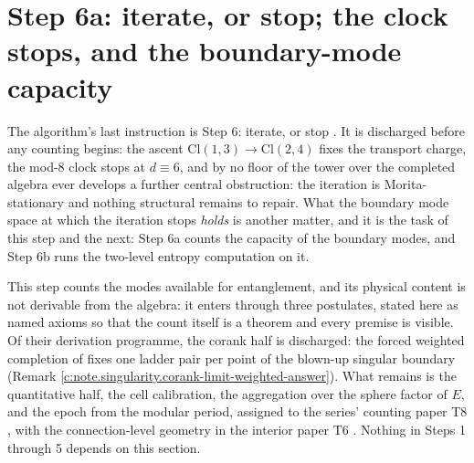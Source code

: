 \documentclass[11pt]{article}
\theoremstyle{definition}
\theoremstyle{plain}
\providecommand{\Cl}{}\renewcommand{\Cl}{\mathrm{Cl}}
\begin{document}
\section{Step 6a: iterate, or stop; the clock stops, and the boundary-mode capacity}

\label{c:note.singularity.setting-step-6a-iterate-or-stop}
The algorithm's last instruction is Step 6: iterate, or stop \cite[\S 8.1, Step 6]{ButlerT1}. It is discharged before any counting begins: the ascent $\Cl(1,3) \to \Cl(2,4)$ fixes the transport charge, the mod-8 clock stops at $d \equiv 6$, and by \cite[Thm.~3.6]{ButlerT3} no floor of the tower over the completed algebra ever develops a further central obstruction: the iteration is Morita-stationary and nothing structural remains to repair. What the boundary mode space at which the iteration stops \emph{holds} is another matter, and it is the task of this step and the next: Step 6a counts the capacity of the boundary modes, and Step 6b runs the two-level entropy computation on it.

This step counts the modes available for entanglement, and its physical content is not derivable from the algebra: it enters through three postulates, stated here as named axioms so that the count itself is a theorem and every premise is visible. Of their derivation programme, the corank half is discharged: the forced weighted completion of \cite[\S 8]{ButlerT4} fixes one ladder pair per point of the blown-up singular boundary (Remark \ref{c:note.singularity.corank-limit-weighted-answer}). What remains is the quantitative half, the cell calibration, the aggregation over the sphere factor of $E$, and the epoch from the modular period, assigned to the series' counting paper T8 \cite{ButlerT8}, with the connection-level geometry in the interior paper T6 \cite{ButlerT6}. Nothing in Steps 1 through 5 depends on this section.
\end{document}
